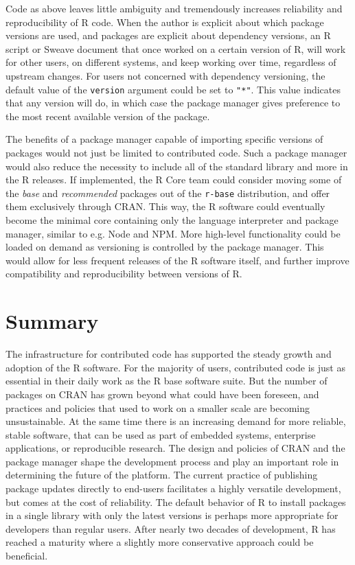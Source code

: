 Code as above leaves little ambiguity and tremendously increases reliability
and reproducibility of R code. When the author is explicit about which package
versions are used, and packages are explicit about dependency versions, an R
script or Sweave document that once worked on a certain version of R, will work
for other users, on different systems, and keep working over time, regardless
of upstream changes. For users not concerned with dependency versioning, the
default value of the \texttt{version} argument could be set to \texttt{"*"}.
This value indicates that any version will do, in which case the package
manager gives preference to the most recent available version of the package.

The benefits of a package manager capable of importing specific versions of
packages would not just be limited to contributed code. Such a package
manager would also reduce the necessity to include all of the standard library
and more in the R releases. If implemented, the R Core team could consider
moving some of the \emph{base} and \emph{recommended} packages out of the
\texttt{r-base} distribution, and offer them exclusively through CRAN. This
way, the R software could eventually become the minimal core containing only
the language interpreter and package manager, similar to e.g. Node and NPM.
More high-level functionality could be loaded on demand as versioning is
controlled by the package manager. This would allow for less frequent releases
of the R software itself, and further improve compatibility and reproducibility
between versions of R.

\section{Summary}

The infrastructure for contributed code has supported the steady growth and
adoption of the R software. For the majority of users, contributed code is just
as essential in their daily work as the R base software suite. But the number
of packages on CRAN has grown beyond what could have been foreseen, and
practices and policies that used to work on a smaller scale are becoming
unsustainable. At the same time there is an increasing demand for more
reliable, stable software, that can be used as part of embedded systems,
enterprise applications, or reproducible research. The design and policies of
CRAN and the package manager shape the development process and play an
important role in determining the future of the platform. The current practice
of publishing package updates directly to end-users facilitates a highly
versatile development, but comes at the cost of reliability. The default
behavior of R to install packages in a single library with only the latest
versions is perhaps more appropriate for developers than regular users. After
nearly two decades of development, R has reached a maturity where a slightly
more conservative approach could be beneficial.

